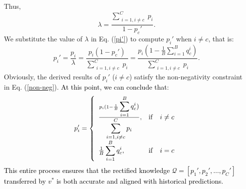 \documentclass[10pt,journal]{IEEEtran}
\let\oldsum\sum
\renewcommand{\sum}{\displaystyle\oldsum}
\begin{document}
Thus,
\begin{equation}
    \lambda = \frac{\sum_{\substack{i = 1, i \neq c}}^{C} p_i}{1 - p_c'}.
\end{equation}
We substitute the value of $\lambda$ in Eq. (\ref{pi'}) to compute $p_i'$ when $i \neq c$, that is:
\begin{equation}
    p_i' = \frac{p_i}{\lambda} = \frac{p_i (1 - p_c')}{\sum_{\substack{i = 1, i \neq c}}^{C} p_i}=\frac{p_i (1 - \frac{1}{B} \sum_{i=1}^B q_c^i)}{\sum_{\substack{i = 1, i \neq c}}^{C} p_i}.
\end{equation}
Obviously, the derived results of $p_i'$ ($i \neq c$) satisfy the non-negativity constraint in Eq. (\ref{non-neg}).
\textcolor{black}{At this point, we can conclude that}:
\begin{equation}
    p_i' = \left\{ {\begin{array}{*{20}{l}}
{\frac{{{p_i}(1 - \frac{1}{B}\sum\limits_{i = 1}^B {q_c^i} )}}{{\sum_{\substack{i = 1, i \neq c}}^{C} {{p_i}} }}},&{{\rm{if }}\quad i \ne c}\\
{\frac{1}{B}\sum\limits_{i = 1}^B {q_c^i} },&{{\rm{if }}\quad i = c}
\end{array}} \right.
\label{Q-compute}
\end{equation}
\textcolor{black}{This entire process ensures that the rectified knowledge $\mathcal{Q}={[p_1',p_2',…,p_C']}$ transferred by $v^*$ is both accurate and aligned with historical predictions.}
\end{document}
